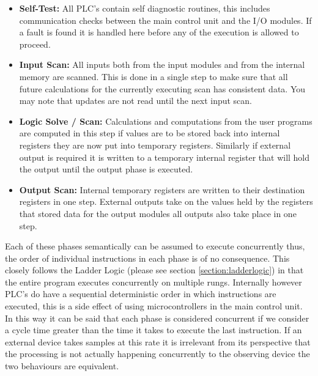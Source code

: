 \begin{itemize}
	\item\textbf{Self-Test:} All PLC's contain self diagnostic routines, this includes communication checks between the main control unit and the I/O modules. If a fault is found it is handled here before any of the execution is allowed to proceed.
	\item\textbf{Input Scan:} All inputs both from the input modules and from the internal memory are scanned. This is done in a single step to make sure that all future calculations for the currently executing scan has consistent data. You may note that updates are not read until the next input scan.
	\item\textbf{Logic Solve / Scan:} Calculations and computations from the user programs are computed in this step if values are to be stored back into internal registers they are now put into temporary registers. Similarly if external output is required it is written to a temporary internal register that will hold the output until the output phase is executed.
	\item\textbf{Output Scan:} Internal temporary registers are written to their destination registers in one step. External outputs take on the values held by the registers that stored data for the output modules all outputs also take place in one step.
\end{itemize}


Each of these phases semantically can be assumed to execute concurrently thus, the order of individual instructions in each phase is of no consequence. This closely follows the Ladder Logic (please see section \ref{section:ladderlogic}) in that the entire program executes concurrently on multiple rungs. Internally however PLC's do have a sequential deterministic order in which instructions are executed, this is a side effect of using microcontrollers in the main control unit. In this way it can be said that each phase is considered concurrent if we consider a cycle time greater than the time it takes to execute the last instruction. If an external device takes samples at this rate it is irrelevant from its perspective that the processing is not actually happening concurrently to the observing device the two behaviours are equivalent.

